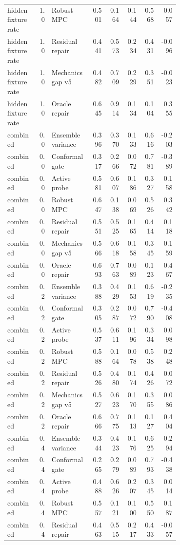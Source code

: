 \documentclass{article}
\begin{document}
\begin{center}
\begin{longtable}{p{0.18\linewidth}rp{0.23\linewidth}rrrrr}
hidden fixture rate & 1.0 & Robust MPC & 0.501 & 0.164 & 0.144 & 0.568 & 0.057\\
hidden fixture rate & 1.0 & Residual repair & 0.441 & 0.573 & 0.234 & 0.431 & -0.096\\
hidden fixture rate & 1.0 & Mechanics gap v5 & 0.482 & 0.709 & 0.229 & 0.351 & -0.023\\
hidden fixture rate & 1.0 & Oracle repair & 0.645 & 0.914 & 0.134 & 0.104 & 0.355\\
combined & 0.0 & Ensemble variance & 0.396 & 0.370 & 0.133 & 0.616 & -0.203\\
combined & 0.0 & Conformal gate & 0.317 & 0.266 & 0.072 & 0.781 & -0.389\\
combined & 0.0 & Active probe & 0.581 & 0.607 & 0.186 & 0.327 & 0.158\\
combined & 0.0 & Robust MPC & 0.647 & 0.138 & 0.069 & 0.526 & 0.342\\
combined & 0.0 & Residual repair & 0.551 & 0.525 & 0.165 & 0.414 & 0.118\\
combined & 0.0 & Mechanics gap v5 & 0.566 & 0.618 & 0.158 & 0.345 & 0.159\\
combined & 0.0 & Oracle repair & 0.693 & 0.763 & 0.089 & 0.123 & 0.467\\
combined & 0.2 & Ensemble variance & 0.388 & 0.429 & 0.153 & 0.619 & -0.235\\
combined & 0.2 & Conformal gate & 0.305 & 0.287 & 0.072 & 0.790 & -0.408\\
combined & 0.2 & Active probe & 0.537 & 0.611 & 0.196 & 0.334 & 0.098\\
combined & 0.2 & Robust MPC & 0.588 & 0.164 & 0.078 & 0.538 & 0.248\\
combined & 0.2 & Residual repair & 0.526 & 0.480 & 0.174 & 0.426 & 0.072\\
combined & 0.2 & Mechanics gap v5 & 0.527 & 0.623 & 0.170 & 0.355 & 0.086\\
combined & 0.2 & Oracle repair & 0.666 & 0.775 & 0.113 & 0.127 & 0.404\\
combined & 0.4 & Ensemble variance & 0.344 & 0.423 & 0.176 & 0.625 & -0.294\\
combined & 0.4 & Conformal gate & 0.265 & 0.279 & 0.089 & 0.793 & -0.438\\
combined & 0.4 & Active probe & 0.488 & 0.626 & 0.207 & 0.345 & 0.014\\
combined & 0.4 & Robust MPC & 0.557 & 0.121 & 0.100 & 0.550 & 0.187\\
combined & 0.4 & Residual repair & 0.463 & 0.515 & 0.217 & 0.433 & -0.057\\

\end{longtable}
\end{center}
\end{document}
